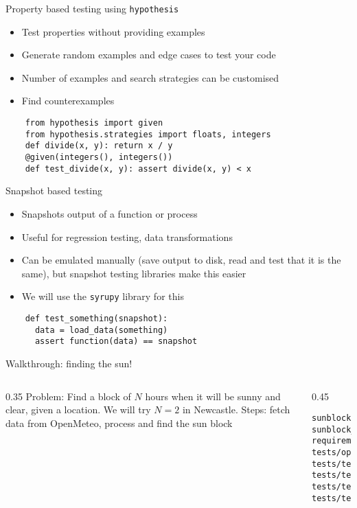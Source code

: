 \documentclass[11pt,xcolor={dvipsnames},hyperref={pdftex,pdfpagemode=UseNone,hidelinks,pdfdisplaydoctitle=true},usepdftitle=false]{beamer}
\begin{document}
\begin{frame}[fragile]{Property based testing using \texttt{hypothesis}}
\label{property-based-testing-using-hypothesis}
\begin{itemize}
\item
  Test properties without providing examples
\item
  Generate random examples and edge cases to test your code
\item
  Number of examples and search strategies can be customised
\item
  Find counterexamples
\end{itemize}
\vskip 0.5cm
\begin{verbatim}
    from hypothesis import given
    from hypothesis.strategies import floats, integers
    def divide(x, y): return x / y
    @given(integers(), integers())
    def test_divide(x, y): assert divide(x, y) < x
\end{verbatim}

\end{frame}


\begin{frame}[fragile]{Snapshot based testing}
\label{snapshot-based-testing}
\begin{itemize}
\item
  Snapshots output of a function or process
\item
  Useful for regression testing, data transformations
\item
  Can be emulated manually (save output to disk, read and test that it
  is the same), but snapshot testing libraries make this easier
\item We will use the \texttt{syrupy} library for this
\end{itemize}
\vskip 0.3cm
\begin{verbatim}
    def test_something(snapshot):
      data = load_data(something)
      assert function(data) == snapshot
\end{verbatim}
\end{frame}


\begin{frame}[fragile]{Walkthrough: finding the sun!}
\label{walkthrough-finding-the-sun}
\begin{columns}
\begin{column}{0.35\textwidth}
\alert{Problem}: Find a block of $N$ hours when it will be sunny and
clear, given a location. We will try $N=2$ in Newcastle.
\vskip 0.3cm
Steps: fetch data from OpenMeteo, process and find the sun block
\end{column}
\begin{column}{0.45\textwidth}
\begin{verbatim}
sunblock.py
sunblock_monolithic.py
requirements.txt
tests/openmeteo.json
tests/test_examples.py
tests/test_mock.py
tests/test_property.py
tests/test_snapshot.py
\end{verbatim}
\end{column}
\end{columns}
\end{frame}
\end{document}
